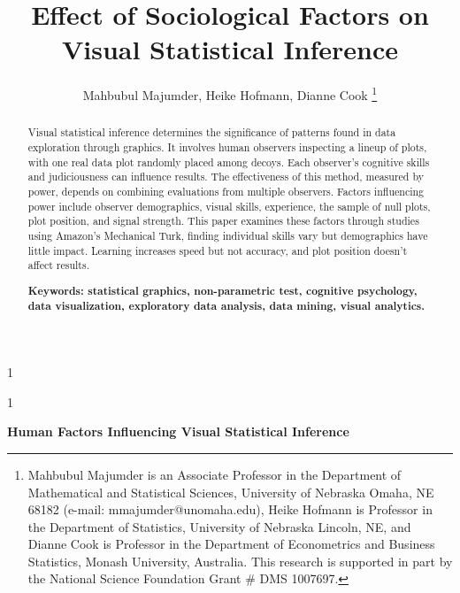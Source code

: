 \documentclass[10pt]{article}\usepackage[]{graphicx}\usepackage[]{xcolor}
\newcommand{\blindDoc}{1}
\begin{document}

\blindDoc
{
  \title{Effect of Sociological Factors on Visual Statistical Inference}
  \author{{Mahbubul Majumder, Heike Hofmann, Dianne Cook}
\thanks{Mahbubul Majumder is an Associate Professor in the Department of Mathematical and Statistical Sciences, University of Nebraska Omaha, NE 68182 (e-mail: mmajumder@unomaha.edu), Heike Hofmann is Professor in the Department of Statistics, University of Nebraska Lincoln, NE, and  Dianne Cook is Professor in the Department of Econometrics and Business Statistics, Monash University, Australia. This research is supported in part by the National Science Foundation Grant \# DMS 1007697.}}
\date{\vspace{-.5in}}
  \maketitle
} \fi

\blindDoc
{
  \bigskip
  \bigskip
  \bigskip
  \begin{center}
    {\bf \LARGE Human Factors Influencing Visual Statistical Inference}
\end{center}
  \medskip
} \fi


\begin {abstract} 

Visual statistical inference determines the significance of patterns found in data exploration through graphics. It involves human observers inspecting a lineup of plots, with one real data plot randomly placed among decoys. Each observer's cognitive skills and judiciousness can influence results. The effectiveness of this method, measured by power, depends on combining evaluations from multiple observers. Factors influencing power include observer demographics, visual skills, experience, the sample of null plots, plot position, and signal strength. This paper examines these factors through studies using Amazon's Mechanical Turk, finding individual skills vary but demographics have little impact. Learning increases speed but not accuracy, and plot position doesn’t affect results.

{\bf Keywords: \sf statistical graphics, non-parametric test, cognitive psychology, data visualization, exploratory data analysis, data mining, visual analytics.} 
\end {abstract}
\end{document}
